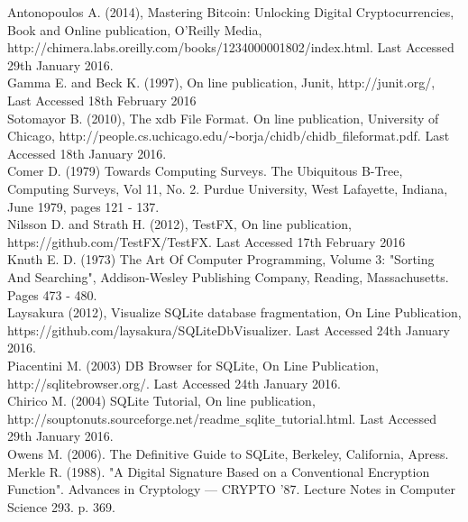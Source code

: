 \begin{thebibliography}{0}

Antonopoulos A. (2014), Mastering Bitcoin: Unlocking Digital Cryptocurrencies, Book and Online publication, O'Reilly Media, http://chimera.labs.oreilly.com/books/1234000001802/index.html. Last Accessed 29th January 2016.
\\
Gamma E. and Beck K. (1997), On line publication, Junit, http://junit.org/, Last Accessed 18th February 2016
\\
Sotomayor B. (2010), The xdb File Format. On line publication, University of Chicago, http://people.cs.uchicago.edu/\verb|~|borja/chidb/chidb\verb|_|fileformat.pdf. Last Accessed 18th January 2016.
\\
Comer D. (1979) Towards Computing Surveys. The Ubiquitous B-Tree, Computing Surveys, Vol 11, No. 2. Purdue University, West Lafayette, Indiana, June 1979, pages 121 - 137.
\\
Nilsson D. and Strath H. (2012), TestFX, On line publication, https://github.com/TestFX/TestFX. Last Accessed 17th February 2016
\\
Knuth E. D. (1973) The Art Of Computer Programming, Volume 3: "Sorting And Searching", Addison-Wesley Publishing Company, Reading, Massachusetts. Pages 473 - 480.
\\
Laysakura (2012), Visualize SQLite database fragmentation, On Line Publication, https://github.com/laysakura/SQLiteDbVisualizer. Last Accessed 24th January 2016.
\\
Piacentini M. (2003) DB Browser for SQLite, On Line Publication, http://sqlitebrowser.org/. Last Accessed 24th January 2016.
\\
Chirico M. (2004) SQLite Tutorial, On line publication, http://souptonuts.sourceforge.net/readme\verb|_|sqlite\verb|_|tutorial.html. Last Accessed 29th January 2016.
\\
Owens M. (2006). The Definitive Guide to SQLite, Berkeley, California, Apress. 
\\
Merkle R. (1988). "A Digital Signature Based on a Conventional Encryption Function". Advances in Cryptology — CRYPTO '87. Lecture Notes in Computer Science 293. p. 369.

\end{thebibliography}
